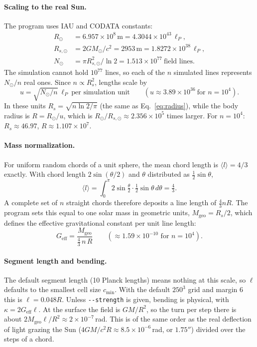 \documentclass[12pt]{article}
\newcommand{\opt}[1]{\texttt{-{}-#1}}
\begin{document}
\paragraph{Scaling to the real Sun.}
The program uses IAU and CODATA constants:
\[
\begin{aligned}
  R_\odot &= 6.957\times10^{8}\,\text{m} = 4.3044\times10^{43}\,\ell_P,\\
  R_{s,\odot} &= 2GM_\odot/c^2 = 2953\,\text{m} = 1.8272\times10^{38}\,\ell_P,\\
  N_\odot &= \pi R_{s,\odot}^2/\ln2 = 1.513\times10^{77}\ \text{field lines}.
\end{aligned}
\]
The simulation cannot hold $10^{77}$ lines, so each of the $n$ simulated
lines represents $N_\odot/n$ real ones. Since $n\propto R_s^2$, lengths scale by
\[
  u = \sqrt{N_\odot/n}\ \ell_P\ \text{per simulation unit}
  \qquad(u\approx3.89\times10^{36}\ \text{for } n=10^4).
\]
In these units $R_s=\sqrt{n\ln2/\pi}$ (the same as Eq.~\eqref{eq:radius}), while the
body radius is $R=R_\odot/u$, which is $R_\odot/R_{s,\odot}\approx2.356\times10^{5}$ times larger. For $n=10^4$:
$R_s\approx46.97$, $R\approx1.107\times10^{7}$.

\paragraph{Mass normalization.}
For uniform random chords of a unit sphere, the mean chord length is
$\langle l\rangle=4/3$ exactly. With chord length $2\sin(\theta/2)$ and
$\theta$ distributed as $\tfrac12\sin\theta$,
\[
  \langle l\rangle=\int_0^\pi 2\sin\tfrac\theta2\cdot\tfrac12\sin\theta\,d\theta=\tfrac43 .
\]
A complete set of $n$ straight chords therefore deposits a line length of $\tfrac43nR$.
The program sets this equal to one solar mass in geometric units,
$M_\text{geo}=R_s/2$, which defines the effective gravitational constant per unit
line length:
\begin{equation}
  G_\text{eff}=\frac{M_\text{geo}}{\tfrac43\,n\,R}\qquad(\approx1.59\times10^{-10}\text{ for }n=10^4).
\end{equation}

\paragraph{Segment length and bending.}
The default segment length (10 Planck lengths) means nothing at this scale, so
$\ell$ defaults to the smallest cell size $c_\text{min}$. With the default
$250^3$ grid and margin 6 this is $\ell=0.048R$. Unless \opt{strength} is given, bending is
physical, with $\kappa=2G_\text{eff}\ell$. At the surface the field is $GM/R^2$, so the
turn per step there is about $2M_\text{geo}\ell/R^2\approx2\times10^{-7}$\,rad. This is
of the same order as the real deflection of light grazing the Sun
($4GM/c^2R\approx8.5\times10^{-6}$\,rad, or $1.75''$) divided over the steps of a chord.
\end{document}
